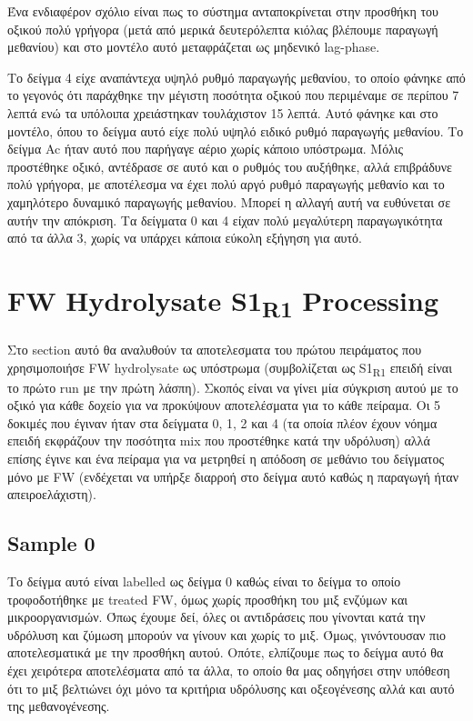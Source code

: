\documentclass[11pt]{article}
\begin{document}
Ένα ενδιαφέρον σχόλιο είναι πως το σύστημα ανταποκρίνεται στην προσθήκη του οξικού πολύ γρήγορα (μετά από μερικά δευτερόλεπτα κιόλας βλέπουμε παραγωγή μεθανίου) και στο μοντέλο αυτό μεταφράζεται ως μηδενικό lag-phase.

Το δείγμα 4 είχε αναπάντεχα υψηλό ρυθμό παραγωγής μεθανίου, το οποίο φάνηκε από το γεγονός ότι παράχθηκε την μέγιστη ποσότητα οξικού που περιμέναμε σε περίπου 7 λεπτά ενώ τα υπόλοιπα χρειάστηκαν τουλάχιστον 15 λεπτά. Αυτό φάνηκε και στο μοντέλο, όπου το δείγμα αυτό είχε πολύ υψηλό ειδικό ρυθμό παραγωγής μεθανίου. Το δείγμα Ac ήταν αυτό που παρήγαγε αέριο χωρίς κάποιο υπόστρωμα. Μόλις προστέθηκε οξικό, αντέδρασε σε αυτό και ο ρυθμός του αυξήθηκε, αλλά επιβράδυνε πολύ γρήγορα, με αποτέλεσμα να έχει πολύ αργό ρυθμό παραγωγής μεθανίο και το χαμηλότερο δυναμικό παραγωγής μεθανίου. Μπορεί η αλλαγή αυτή να ευθύνεται σε αυτήν την απόκριση. Τα δείγματα 0 και 4 είχαν πολύ μεγαλύτερη παραγωγικότητα από τα άλλα 3, χωρίς να υπάρχει κάποια εύκολη εξήγηση για αυτό.

\pagebreak

\section{FW Hydrolysate S1\textsubscript{R1} Processing}
\label{sec:org900e8d4}
Στο section αυτό θα αναλυθούν τα αποτελεσματα του πρώτου πειράματος που χρησιμοποιήσε FW hydrolysate ως υπόστρωμα (συμβολίζεται ως S1\textsubscript{R1} επειδή είναι το πρώτο run με την πρώτη λάσπη). Σκοπός είναι να γίνει μία σύγκριση αυτού με το οξικό για κάθε δοχείο για να προκύψουν αποτελέσματα για το κάθε πείραμα. Οι 5 δοκιμές που έγιναν ήταν στα δείγματα 0, 1, 2 και 4 (τα οποία πλέον έχουν νόημα επειδή εκφράζουν την ποσότητα mix που προστέθηκε κατά την υδρόλυση) αλλά επίσης έγινε και ένα πείραμα για να μετρηθεί η απόδοση σε μεθάνιο του δείγματος μόνο με FW (ενδέχεται να υπήρξε διαρροή στο δείγμα αυτό καθώς η παραγωγή ήταν απειροελάχιστη).

\subsection{Sample 0}
\label{sec:orgbfa858d}
Το δείγμα αυτό είναι labelled ως δείγμα 0 καθώς είναι το δείγμα το οποίο τροφοδοτήθηκε με treated FW, όμως χωρίς προσθήκη του μιξ ενζύμων και μικροοργανισμών. Όπως έχουμε δεί, όλες οι αντιδράσεις που γίνονται κατά την υδρόλυση και ζύμωση μπορούν να γίνουν και χωρίς το μιξ. Όμως, γινόντουσαν πιο αποτελεσματικά με την προσθήκη αυτού. Οπότε, ελπίζουμε πως το δείγμα αυτό θα έχει χειρότερα αποτελέσματα από τα άλλα, το οποίο θα μας οδηγήσει στην υπόθεση ότι το μιξ βελτιώνει όχι μόνο τα κριτήρια υδρόλυσης και οξεογένεσης αλλά και αυτό της μεθανογένεσης.
\end{document}
